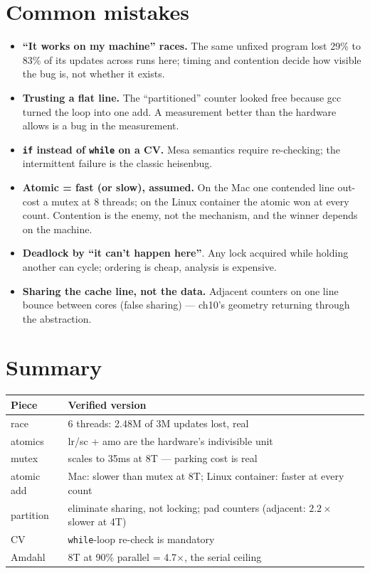 \section{Common mistakes}
\label{sec:mistakes13}
\begin{itemize}
\item \textbf{``It works on my machine'' races.} The same unfixed
      program lost 29\% to 83\% of its updates across runs here;
      timing and contention decide how visible the bug is, not
      whether it exists.
\item \textbf{Trusting a flat line.} The ``partitioned'' counter
      looked free because gcc turned the loop into one add. A
      measurement better than the hardware allows is a bug in the
      measurement.
\item \textbf{\texttt{if} instead of \texttt{while} on a CV.} Mesa
      semantics require re-checking; the intermittent failure is
      the classic heisenbug.
\item \textbf{Atomic = fast (or slow), assumed.} On the Mac one
      contended line out-cost a mutex at 8 threads; on the Linux
      container the atomic won at every count. Contention is the
      enemy, not the mechanism, and the winner depends on the
      machine.
\item \textbf{Deadlock by ``it can't happen here''}. Any lock
      acquired while holding another can cycle; ordering is
      cheap, analysis is expensive.
\item \textbf{Sharing the cache line, not the data.} Adjacent
      counters on one line bounce between cores (false sharing) ---
      ch10's geometry returning through the abstraction.
\end{itemize}

\section{Summary}
\label{sec:summary13}
\begin{tabularx}{\linewidth}{@{}l X@{}}
\toprule
\textbf{Piece} & \textbf{Verified version} \\
\midrule
race      & 6 threads: 2.48M of 3M updates lost, real \\
atomics   & lr/sc + amo are the hardware's indivisible unit \\
mutex     & scales to 35ms at 8T --- parking cost is real \\
atomic add & Mac: slower than mutex at 8T; Linux container: faster at every count \\
partition & eliminate sharing, not locking; pad counters (adjacent: $2.2\times$ slower at 4T) \\
CV        & \texttt{while}-loop re-check is mandatory \\
Amdahl    & 8T at 90\% parallel = 4.7$\times$, the serial ceiling \\
\bottomrule
\end{tabularx}

